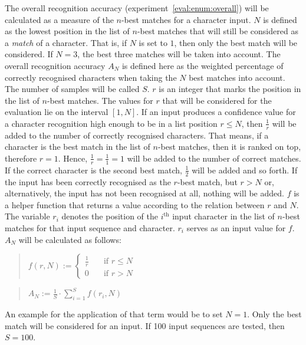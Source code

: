 The overall recognition accuracy (experiment~\ref{eval:enum:overall}) will 
be calculated as a measure of the \(n\)-best matches for a character input. 
\(N\) is defined as the lowest position in the list of \(n\)-best matches 
that will still be considered as a \emph{match} of a character. 
That is, if \(N\) is set to \(1\), then only the best match will be considered.
If \(N = 3\), the best three matches will be taken into account.
The overall recognition accuracy \(A_{N}\) is defined here as the weighted 
percentage of correctly recognised characters when taking the \(N\) best 
matches into account. The number of samples will be called \(S\).
\(r\) is an integer that marks the position in the list of \(n\)-best matches.
The values for \(r\) that will be considered for the evaluation lie 
on the interval \([1,N]\). If an input produces a confidence value 
for a character recognition high enough to be in a list position \(r \leq N\), 
then \(\frac{1}{r}\) will be added to the number of correctly 
recognised characters.
That means, if a character is the best match in the list of \(n\)-best matches,
then it is ranked on top, therefore \(r = 1\). 
Hence, \(\frac{1}{r} = \frac{1}{1} = 1\) will be added to the number of 
correct matches. If the correct character is the second best match, 
\(\frac{1}{2}\) will be added and so forth. If the input has been correctly 
recognised as the \(r\)-best match, but \(r > N\) or, alternatively,
the input has not been recognised at all, nothing will be added. 
\(f\) is a helper function that returns a value
according to the relation between \(r\) and \(N\). The variable
\(r_{i}\) denotes the position of the \(i^{\text{th}}\) input character in
the list of \(n\)-best matches for that input sequence and character. \(r_{i}\) serves as an input
value for \(f\). \(A_N\) will be calculated as follows:
\begin{quote}
  \(
    f(r, N):=
    \begin{cases}
      \frac{1}{r} & \quad \text{if $r \leq N$} \\
      0 & \quad \text{if $r > N$}
    \end{cases}
  \)
\end{quote}
\begin{quote}
  \(
    A_N := \frac{1}{S} \cdot \sum\limits_{i=1}^{S}{f(r_{i},N)}
  \)
\end{quote}\label{eval:accuracycalculation}
An example for the application of that term would be to set \(N = 1\).
Only the best match will be considered for an input.
If 100 input sequences are tested, then \(S=100\). 
